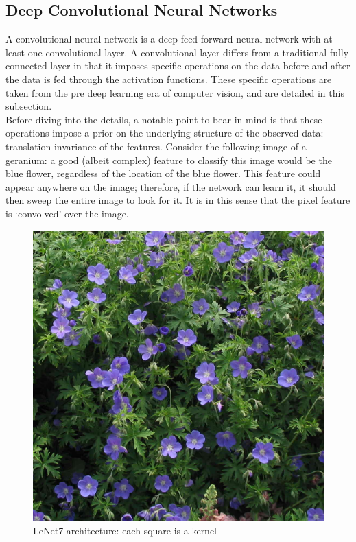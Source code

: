 \documentclass[a4paper,11pt]{article}
\begin{document}
\clearpage

\subsection{Deep Convolutional Neural Networks}

A convolutional neural network is a deep feed-forward neural network with at least one convolutional layer. A convolutional layer differs from a traditional fully connected layer in that it imposes specific operations on the data before and after the data is fed through the activation functions. These specific operations are taken from the pre deep learning era of computer vision, and are detailed in this subsection. \\

Before diving into the details, a notable point to bear in mind is that these operations impose a prior on the underlying structure of the observed data: translation invariance of the features. Consider the following image of a geranium: a good (albeit complex) feature to classify this image would be the blue flower, regardless of the location of the blue flower. This feature could appear anywhere on the image; therefore, if the network can learn it, it should then sweep the entire image to look for it. It is in this sense that the pixel feature is `convolved' over the image. \\

\begin{figure}[h!]
	\centering
	\includegraphics[scale=0.2]{images/geranium.jpg}
	\caption{LeNet7 architecture: each square is a kernel}
    \label{f17}
\end{figure}
\end{document}
